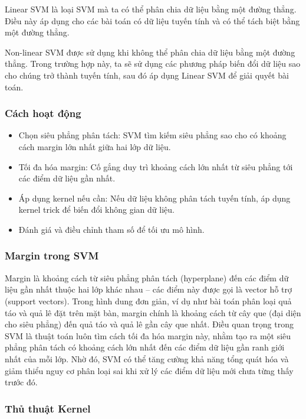 \documentclass[
]{article}
\begin{document}
Linear SVM là loại SVM mà ta có thể phân chia dữ liệu bằng một đường
thẳng. Điều này áp dụng cho các bài toán có dữ liệu tuyến tính và có thể
tách biệt bằng một đường thẳng.

Non-linear SVM được sử dụng khi không thể phân chia dữ liệu bằng một
đường thẳng. Trong trường hợp này, ta sẽ sử dụng các phương pháp biến
đổi dữ liệu sao cho chúng trở thành tuyến tính, sau đó áp dụng Linear
SVM để giải quyết bài toán.

\subsubsection{Cách hoạt động}\label{cuxe1ch-houx1ea1t-ux111ux1ed9ng}

\begin{itemize}
\item
  Chọn siêu phẳng phân tách: SVM tìm kiếm siêu phẳng sao cho có khoảng
  cách margin lớn nhất giữa hai lớp dữ liệu.
\item
  Tối đa hóa margin: Cố gắng duy trì khoảng cách lớn nhất từ siêu phẳng
  tới các điểm dữ liệu gần nhất.
\item
  Áp dụng kernel nếu cần: Nếu dữ liệu không phân tách tuyến tính, áp
  dụng kernel trick để biến đổi không gian dữ liệu.
\item
  Đánh giá và điều chỉnh tham số để tối ưu mô hình.
\end{itemize}

\subsubsection{Margin trong SVM}\label{margin-trong-svm}

Margin là khoảng cách từ siêu phẳng phân tách (hyperplane) đến các điểm
dữ liệu gần nhất thuộc hai lớp khác nhau -- các điểm này được gọi là
vector hỗ trợ (support vectors). Trong hình dung đơn giản, ví dụ như bài
toán phân loại quả táo và quả lê đặt trên mặt bàn, margin chính là
khoảng cách từ cây que (đại diện cho siêu phẳng) đến quả táo và quả lê
gần cây que nhất. Điều quan trọng trong SVM là thuật toán luôn tìm cách
tối đa hóa margin này, nhằm tạo ra một siêu phẳng phân tách có khoảng
cách lớn nhất đến các điểm dữ liệu gần ranh giới nhất của mỗi lớp. Nhờ
đó, SVM có thể tăng cường khả năng tổng quát hóa và giảm thiểu nguy cơ
phân loại sai khi xử lý các điểm dữ liệu mới chưa từng thấy trước đó.

\subsubsection{Thủ thuật Kernel}\label{thux1ee7-thuux1eadt-kernel}
\end{document}
